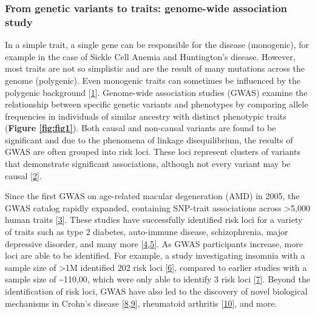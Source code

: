 \hypertarget{from-genetic-variants-to-traits-genome-wide-association-study}{%
\subsubsection{From genetic variants to traits: genome-wide association study}\label{from-genetic-variants-to-traits-genome-wide-association-study}}

In a simple trait, a single gene can be responsible for the disease (monogenic), for example in the case of Sickle Cell Anemia and Huntington's disease.
However, most traits are not so simplistic and are the result of many mutations across the genome (polygenic).
Even monogenic traits can sometimes be influenced by the polygenic background {[}\protect\hyperlink{ref-VqGYQMXO}{1}{]}.
Genome-wide association studies (GWAS) examine the relationship between specific genetic variants and phenotypes by comparing allele frequencies in individuals of similar ancestry with distinct phenotypic traits (\textbf{Figure \ref{fig:fig1}}).
Both causal and non-causal variants are found to be significant and due to the phenomena of linkage disequilibrium, the results of GWAS are often grouped into risk loci.
These loci represent clusters of variants that demonstrate significant associations, although not every variant may be causal {[}\protect\hyperlink{ref-1873zCaaX}{2}{]}.

Since the first GWAS on age-related macular degeneration (AMD) in 2005, the GWAS catalog rapidly expanded, containing SNP-trait associations across \textgreater5,000 human traits {[}\protect\hyperlink{ref-VRCjjZ9L}{3}{]}.
These studies have successfully identified risk loci for a variety of traits such as type 2 diabetes, auto-immune disease, schizophrenia, major depressive disorder, and many more {[}\protect\hyperlink{ref-17B4AigZT}{4},\protect\hyperlink{ref-yqBcaXHD}{5}{]}.
As GWAS participants increase, more loci are able to be identified.
For example, a study investigating insomnia with a sample size of \textgreater1M identified 202 risk loci {[}\protect\hyperlink{ref-sBTrhvlJ}{6}{]}, compared to earlier studies with a sample size of \textasciitilde110,00, which were only able to identify 3 risk loci {[}\protect\hyperlink{ref-crCAymA1}{7}{]}.
Beyond the identification of risk loci, GWAS have also led to the discovery of novel biological mechanisms in Crohn's disease {[}\protect\hyperlink{ref-s6z5ZuY3}{8},\protect\hyperlink{ref-gxwza7fO}{9}{]}, rheumatoid arthritis {[}\protect\hyperlink{ref-HicyXvA4}{10}{]}, and more.

